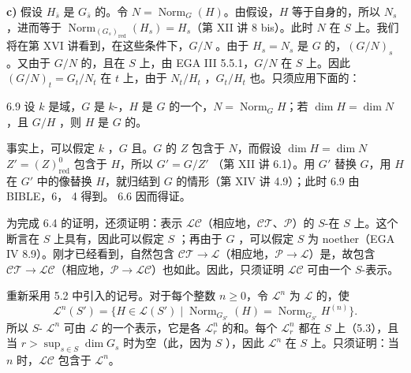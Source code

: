 \textbf{c)} 假设 $H_{\bar s}$ 是 $G_{\bar s}$ 的。令 $N=\operatorname{Norm}_G(H)$。由假设，$H$ 等于自身的，所以 $N_s$ ，进而等于 $\operatorname{Norm}_{(G_s)_{\mathrm{red}}}(H_s)=H_s$（第 XII 讲 8 bis）。此时 $N$ 在 $S$ 上。我们将在第 XVI 讲看到，在这些条件下，$G/N$ 。由于 $H_s=N_s$ 是 $G$ 的，$(G/N)_s$ 。又由于 $G/N$ 的，且在 $S$ 上，由 EGA III 5.5.1，$G/N$ 在 $S$ 上。因此 $(G/N)_t=G_t/N_t$ 在 $t$ 上，由于 $N_t/H_t$ ，$G_t/H_t$ 也。只须应用下面的：
\begin{SGAresult}{}{6.9}
设 $k$ 是域，$G$ 是 $k$-，$H$ 是 $G$ 的一个，$N=\operatorname{Norm}_GH$；若 $\dim H=\dim N$，且 $G/H$ ，则 $H$ 是 $G$ 的。
\end{SGAresult}
事实上，可以假定 $k$ ，$G$ 且。$G$ 的 $Z$ 包含于 $N$，而假设 $\dim H=\dim N$  $Z'=(Z)_{\mathrm{red}}^0$ 包含于 $H$，所以 $G'=G/Z'$ （第 XII 讲 6.1）。用 $G'$ 替换 $G$，用 $H$ 在 $G'$ 中的像替换 $H$，就归结到 $G$ 的情形（第 XIV 讲 4.9）；此时 6.9 由 BIBLE，6， 4 得到。 6.6 因而得证。

为完成 6.4 的证明，还须证明：表示 $\mathscr L\mathscr C$（相应地，$\mathscr C\mathscr T$、$\mathscr P$）的 $S$-在 $S$ 上。这个断言在 $S$ 上具有，因此可以假定 $S$ ；再由于 $G$ ，可以假定 $S$ 为 noether（EGA IV 8.9）。刚才已经看到，自然包含 $\mathscr C\mathscr T\to\mathscr L$（相应地，$\mathscr P\to\mathscr L$）是，故包含 $\mathscr C\mathscr T\to\mathscr L\mathscr C$（相应地，$\mathscr P\to\mathscr L\mathscr C$）也如此。因此，只须证明 $\mathscr L\mathscr C$ 可由一个 $S$-表示。

重新采用 5.2 中引入的记号。对于每个整数 $n\geq0$，令 $\mathscr L^n$ 为 $\mathscr L$ 的，使
\[\mathscr L^n(S')=\{H\in\mathscr L(S')\mid\operatorname{Norm}_{G_{S'}}(H)=\operatorname{Norm}_{G_{S'}}H^{(n)}\}.\]
所以 $S$- $\mathscr L^n$ 可由 $\mathscr L$ 的一个表示，它是各 $\mathscr L_r^n$ 的和。每个 $\mathscr L_r^n$ 都在 $S$ 上（5.3），且当 $r>\sup_{s\in S}\dim G_s$ 时为空（此，因为 $S$ ），因此 $\mathscr L^n$ 在 $S$ 上。只须证明：当 $n$ 时，$\mathscr L\mathscr C$ 包含于 $\mathscr L^n$。

